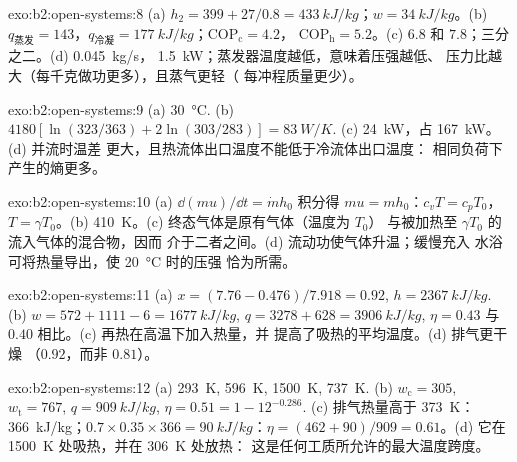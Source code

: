 \begin{solution}{exo:b2:open-systems:8}
(a) $h_2 = 399 + 27/0.8 = \qty{433}{kJ/kg}$；$w = \qty{34}{kJ/kg}$。(b) $q_{\text{蒸发}}
= 143$，$q_{\text{冷凝}} = \qty{177}{kJ/kg}$；$\mathrm{COP}_{\text{c}} = 4.2$，
$\mathrm{COP}_{\text{h}} = 5.2$。(c) $6.8$ 和 $7.8$；三分之二。(d) \qty{0.045}{kg/s}，
\qty{1.5}{kW}；蒸发器温度越低，意味着压强越低、
压力比越大（每千克做功更多），且蒸气更轻（
每冲程质量更少）。
\end{solution}

\begin{solution}{exo:b2:open-systems:9}
(a) \qty{30}{\celsius}. (b) $4180[\ln(323/363) + 2\ln(303/283)] = \qty{83}{W/K}$.
(c) \qty{24}{kW}，占 \qty{167}{kW}。(d) 并流时温差
更大，且热流体出口温度不能低于冷流体出口温度：
相同负荷下产生的熵更多。
\end{solution}

\begin{solution}{exo:b2:open-systems:10}
(a) $\dd(mu)/\dd t = \dot m h_0$ 积分得 $mu = mh_0$：$c_vT = c_pT_0$，
$T = \gamma T_0$。(b) \qty{410}{K}。(c) 终态气体是原有气体（温度为 $T_0$）
与被加热至 $\gamma T_0$ 的流入气体的混合物，因而
介于二者之间。(d) 流动功使气体升温；缓慢充入
水浴可将热量导出，使 \qty{20}{\celsius} 时的压强
恰为所需。
\end{solution}

\begin{solution}{exo:b2:open-systems:11}
(a) $x = (7.76 - 0.476)/7.918 = 0.92$, $h = \qty{2367}{kJ/kg}$. (b) $w = 572 + 1111
- 6 = \qty{1677}{kJ/kg}$, $q = 3278 + 628 = \qty{3906}{kJ/kg}$, $\eta = 0.43$
与 $0.40$ 相比。(c) 再热在高温下加入热量，并
提高了吸热的平均温度。(d) 排气更干燥
（$0.92$，而非 $0.81$）。
\end{solution}

\begin{solution}{exo:b2:open-systems:12}
(a) \qty{293}{K}, \qty{596}{K}, \qty{1500}{K}, \qty{737}{K}. (b) $w_{\text{c}} = 305$,
$w_{\text{t}} = 767$, $q = \qty{909}{kJ/kg}$, $\eta = 0.51 = 1 - 12^{-0.286}$. (c)
排气热量高于 \qty{373}{K}：\qty{366}{kJ/kg}；$0.7 \times 0.35 \times 366 =
\qty{90}{kJ/kg}$：$\eta = (462 + 90)/909 = 0.61$。(d) 它在
\qty{1500}{K} 处吸热，并在 \qty{306}{K} 处放热：
这是任何工质所允许的最大温度跨度。
\end{solution}

